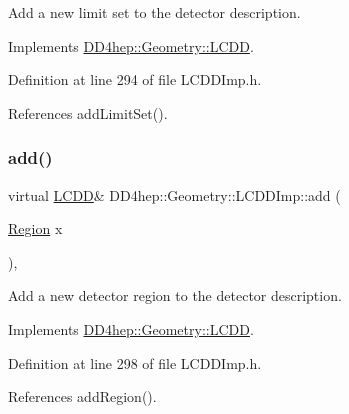 Add a new limit set to the detector description. 



Implements \hyperlink{class_d_d4hep_1_1_geometry_1_1_l_c_d_d_a2b6a8c58332d26518c9def51f1acbc0d}{D\+D4hep\+::\+Geometry\+::\+L\+C\+DD}.



Definition at line 294 of file L\+C\+D\+D\+Imp.\+h.



References add\+Limit\+Set().

\hypertarget{class_d_d4hep_1_1_geometry_1_1_l_c_d_d_imp_ab8c4f8e119f235e5f050349b19892d47}{}\label{class_d_d4hep_1_1_geometry_1_1_l_c_d_d_imp_ab8c4f8e119f235e5f050349b19892d47} 
\subsubsection{\texorpdfstring{add()}{add()}\hspace{0.1cm}{\footnotesize\ttfamily [3/10]}}
{\footnotesize\ttfamily virtual \hyperlink{class_d_d4hep_1_1_geometry_1_1_l_c_d_d}{L\+C\+DD}\& D\+D4hep\+::\+Geometry\+::\+L\+C\+D\+D\+Imp\+::add (\begin{DoxyParamCaption}\item[{\hyperlink{class_d_d4hep_1_1_geometry_1_1_region}{Region}}]{x }\end{DoxyParamCaption})\hspace{0.3cm}{\ttfamily [inline]}, {\ttfamily [virtual]}}



Add a new detector region to the detector description. 



Implements \hyperlink{class_d_d4hep_1_1_geometry_1_1_l_c_d_d_a618c1268be853682f6da33777aae71a8}{D\+D4hep\+::\+Geometry\+::\+L\+C\+DD}.



Definition at line 298 of file L\+C\+D\+D\+Imp.\+h.



References add\+Region().

\hypertarget{class_d_d4hep_1_1_geometry_1_1_l_c_d_d_imp_a43d0c83fce1485a129e721f0efa9ea6a}{}\label{class_d_d4hep_1_1_geometry_1_1_l_c_d_d_imp_a43d0c83fce1485a129e721f0efa9ea6a} 

